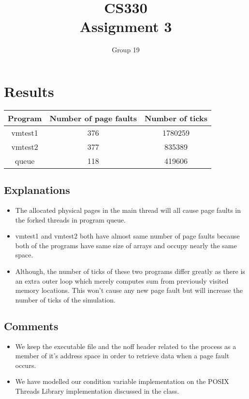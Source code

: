\documentclass{article}
\author{Group 19}
\title{CS330 \\ Assignment 3}
\date{}
\begin{document}
\maketitle

\section{Results}
\begin{center}
\begin{tabular}{| c | c | c |}
\hline
\textbf{Program} & \textbf{Number of page faults} & \textbf{Number of ticks}\\
\hline
vmtest1 & 376 & 1780259 \\
\hline
vmtest2 & 377 & 835389 \\
\hline
queue & 118 & 419606 \\
\hline
\end{tabular}
\end{center}
\subsection{Explanations}
\begin{itemize}
\item The allocated physical pages in the main thread will all cause page faults in the forked threads in program queue. 
\item vmtest1 and vmtest2 both have almost same number of page faults because both of the programs have same size of arrays and occupy nearly the same space. 
\item Although, the number of ticks of these two programs differ greatly as there is an extra outer loop which merely computes sum from previously visited memory locations. This won't cause any new page fault but will increase the number of ticks of the simulation. 
\end{itemize}
\subsection{Comments}

\begin{itemize}
\item We keep the executable file and the noff header related to the process as a member of it's address space in order to retrieve data when a page fault occurs. 
\item We have modelled our condition variable implementation on the POSIX Threads Library implementation discussed in the class.\end{itemize}
\end{document}
